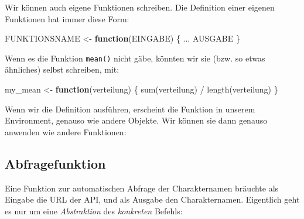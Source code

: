 \documentclass[
  ngerman,
]{article}
\newenvironment{Shaded}{\begin{snugshade}}{\end{snugshade}}
\newcommand{\ControlFlowTok}[1]{\textcolor[rgb]{0.13,0.29,0.53}{\textbf{#1}}}
\newcommand{\DocumentationTok}[1]{\textcolor[rgb]{0.56,0.35,0.01}{\textbf{\textit{#1}}}}
\newcommand{\FunctionTok}[1]{\textcolor[rgb]{0.00,0.00,0.00}{#1}}
\newcommand{\NormalTok}[1]{#1}
\newcommand{\OtherTok}[1]{\textcolor[rgb]{0.56,0.35,0.01}{#1}}
\newcommand{\SpecialCharTok}[1]{\textcolor[rgb]{0.00,0.00,0.00}{#1}}
\newcommand{\StringTok}[1]{\textcolor[rgb]{0.31,0.60,0.02}{#1}}
\begin{document}
Wir können auch eigene Funktionen schreiben. Die Definition einer eigenen Funktionen hat immer diese Form:

\begin{Shaded}
\begin{Highlighting}[]
\NormalTok{FUNKTIONSNAME }\OtherTok{\textless{}{-}} \ControlFlowTok{function}\NormalTok{(EINGABE) \{}
\NormalTok{  ...}
\NormalTok{  AUSGABE}
\NormalTok{\}}
\end{Highlighting}
\end{Shaded}

Wenn es die Funktion \texttt{mean()} nicht gäbe, könnten wir sie (bzw. so etwas ähnliches) selbst schreiben, mit:

\begin{Shaded}
\begin{Highlighting}[]
\NormalTok{my\_mean }\OtherTok{\textless{}{-}} \ControlFlowTok{function}\NormalTok{(verteilung) \{}
  \FunctionTok{sum}\NormalTok{(verteilung) }\SpecialCharTok{/} \FunctionTok{length}\NormalTok{(verteilung)}
\NormalTok{\}}
\end{Highlighting}
\end{Shaded}

Wenn wir die Definition ausführen, erscheint die Funktion in unserem Environment, genauso wie andere Objekte. Wir können sie dann genauso anwenden wie andere Funktionen:

\begin{Shaded}
\end{Shaded}

\hypertarget{abfragefunktion}{%
\subsection{Abfragefunktion}\label{abfragefunktion}}

Eine Funktion zur automatischen Abfrage der Charakternamen bräuchte als Eingabe die URL der API, und als Ausgabe den Charakternamen. Eigentlich geht es nur um eine \emph{Abstraktion} des \emph{konkreten} Befehls:

\begin{Shaded}
\end{Shaded}
\end{document}
